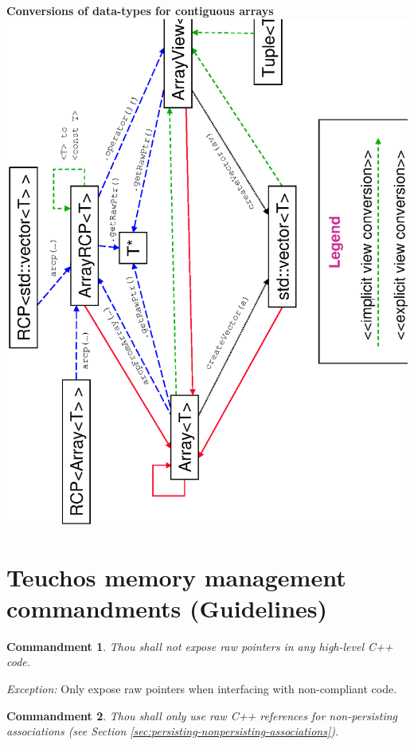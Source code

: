 \documentclass[pdf,ps2pdf,11pt]{SANDreport}
\newtheorem{commandment}{Commandment}
\begin{document}
\begin{center}
{}\textbf{Conversions of data-types for contiguous arrays}
\includegraphics*[angle=270,scale=0.65]{TeuchosArrayConversions}


\end{center}


%
{}\section{Teuchos memory management commandments (Guidelines)}
\label{apdx:commandments}
%

\begin{commandment}
Thou shall not expose raw pointers in any high-level C++ code.
\end{commandment}
{}\textit{Exception:} Only expose raw pointers when interfacing with
non-compliant code.

\begin{commandment}
Thou shall only use raw C++ references for non-persisting associations
(see Section {}\ref{sec:persisting-nonpersisting-associations}).
\end{commandment}
\end{document}
